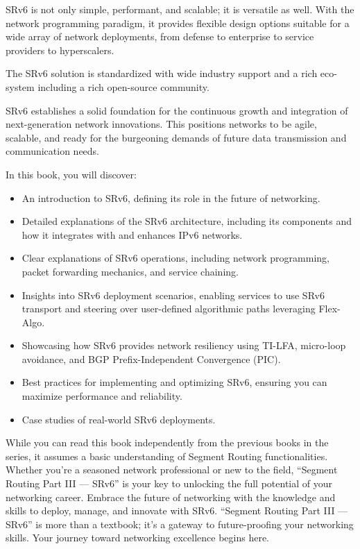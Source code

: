SRv6 is not only simple, performant, and scalable; it is versatile as well. With the network programming paradigm, it provides flexible design options suitable for a wide array of network deployments, from defense to enterprise to service providers to hyperscalers.

The SRv6 solution is standardized with wide industry support and a rich eco-system including a rich open-source community.

SRv6 establishes a solid foundation for the continuous growth and integration of next-generation network innovations. This positions networks to be agile, scalable, and ready for the burgeoning demands of future data transmission and communication needs.

In this book, you will discover:

\begin{itemize}
\item
  An introduction to SRv6, defining its role in the future of networking.
\item
  Detailed explanations of the SRv6 architecture, including its components and how it integrates with and enhances IPv6 networks.
\item
  Clear explanations of SRv6 operations, including network programming, packet forwarding mechanics, and service chaining.
\item
  Insights into SRv6 deployment scenarios, enabling services to use SRv6 transport and steering over user-defined algorithmic paths leveraging Flex-Algo.
\item
  Showcasing how SRv6 provides network resiliency using TI-LFA, micro-loop avoidance, and BGP Prefix-Independent Convergence (PIC).
\item
  Best practices for implementing and optimizing SRv6, ensuring you can maximize performance and reliability.
\item
  Case studies of real-world SRv6 deployments.
\end{itemize}

While you can read this book independently from the previous books in the series, it assumes a basic understanding of Segment Routing functionalities. Whether you're a seasoned network professional or new to the field, ``Segment Routing Part III --- SRv6'' is your key to unlocking the full potential of your networking career. Embrace the future of networking with the knowledge and skills to deploy, manage, and innovate with SRv6. ``Segment Routing Part III --- SRv6'' is more than a textbook; it's a gateway to future-proofing your networking skills. Your journey toward networking excellence begins here.

